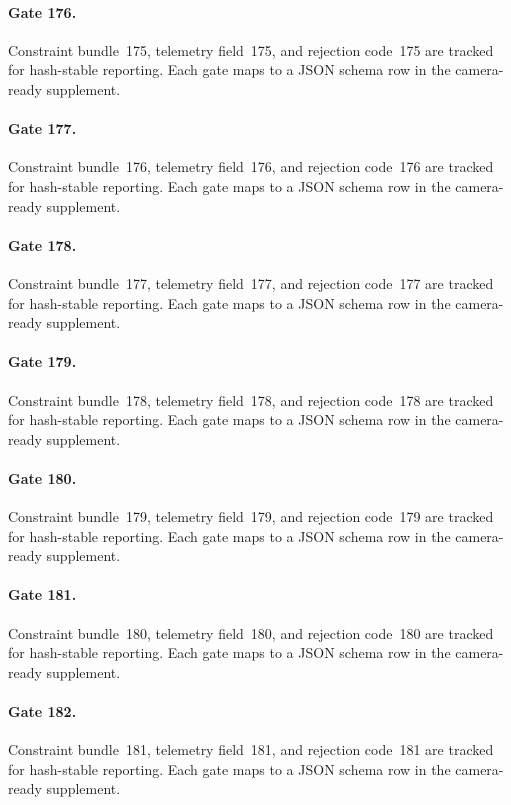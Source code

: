 \documentclass[sigconf,nonacm]{acmart}
\begin{document}
\paragraph{Gate 176.}
Constraint bundle~175, telemetry field~175, and rejection code~175 are tracked for hash-stable reporting. Each gate maps to a JSON schema row in the camera-ready supplement. %

\paragraph{Gate 177.}
Constraint bundle~176, telemetry field~176, and rejection code~176 are tracked for hash-stable reporting. Each gate maps to a JSON schema row in the camera-ready supplement. %

\paragraph{Gate 178.}
Constraint bundle~177, telemetry field~177, and rejection code~177 are tracked for hash-stable reporting. Each gate maps to a JSON schema row in the camera-ready supplement. %

\paragraph{Gate 179.}
Constraint bundle~178, telemetry field~178, and rejection code~178 are tracked for hash-stable reporting. Each gate maps to a JSON schema row in the camera-ready supplement. %

\paragraph{Gate 180.}
Constraint bundle~179, telemetry field~179, and rejection code~179 are tracked for hash-stable reporting. Each gate maps to a JSON schema row in the camera-ready supplement. %

\paragraph{Gate 181.}
Constraint bundle~180, telemetry field~180, and rejection code~180 are tracked for hash-stable reporting. Each gate maps to a JSON schema row in the camera-ready supplement. %

\paragraph{Gate 182.}
Constraint bundle~181, telemetry field~181, and rejection code~181 are tracked for hash-stable reporting. Each gate maps to a JSON schema row in the camera-ready supplement. %
\end{document}
